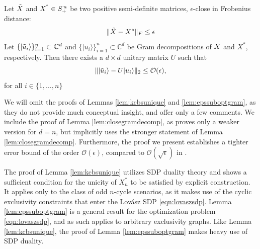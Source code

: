 \begin{lemma}
\label{lem:closegramdecomp}
Let $\Tilde{X}$ and $X^*$ $\in S_{+}^{\thinspace n}$ be two positive semi-definite matrices, $\epsilon$-close in Frobenius distance:
\begin{equation*}
\|\Tilde{X}-X^*\|_F \leq \epsilon
\end{equation*}
Let $\{\vert \Tilde{u}_i \rangle\}_{i=1}^n\subset\mathbb{C}^{d}$ and $\{\vert u_i\rangle\}_{i=1}^n\subset\mathbb{C}^{d}$ be Gram decompositions of $\Tilde{X}$ and $X^*$, respectively. Then there exists a $d\times d$ unitary matrix $U$ such that
\begin{equation*}
    \|\vert \Tilde{u}_i\rangle - U \vert u_i\rangle\|_2 \leq \mathcal{O}(\epsilon),
\end{equation*}
for all $i\in\{1,\dots,n\}$
\end{lemma}

We will omit the proofs of Lemmas \ref{lem:kcbsunique} and \ref{lem:epssuboptgram}, as they do not provide much conceptual insight, and offer only a few comments. We include the proof of Lemma \ref{lem:closegramdecomp}, as \cite{Bharti2019} proves only a weaker version for $d=n$, but implicitly uses the stronger statement of Lemma \ref{lem:closegramdecomp}. Furthermore, the proof we present establishes a tighter error bound of the order $\mathcal{O}(\epsilon)$, compared to $\mathcal{O}(\sqrt{\epsilon})$ in \cite{Bharti2019}.

The proof of Lemma \ref{lem:kcbsunique} utilizes SDP duality theory and shows a sufficient condition for the unicity of $X^*_n$ to be satisfied by explicit construction. It applies only to the class of odd $n$-cycle scenarios, as it makes use of the cyclic exclusivity constraints that enter the Lovász SDP \ref{eqn:lovaszsdp}. Lemma \ref{lem:epssuboptgram} is a general result for the optimization problem \ref{eqn:lovaszsdp}, and as such applies to arbitrary exclusivity graphs. Like Lemma \ref{lem:kcbsunique}, the proof of Lemma \ref{lem:epssuboptgram} makes heavy use of SDP duality. 

